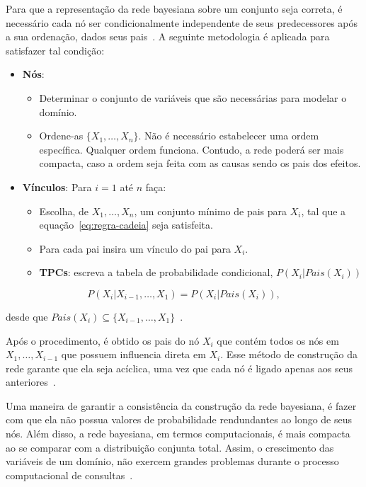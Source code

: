 Para que a representação da rede bayesiana sobre um conjunto seja correta, é necessário cada nó ser condicionalmente independente de seus predecessores após a sua ordenação, dados seus pais~\cite{Russell:2002}. A seguinte metodologia é aplicada para satisfazer tal condição:

\begin{itemize}
    \item \textbf{Nós}:
    \begin{itemize}
        \item Determinar o conjunto de variáveis que são necessárias para modelar o domínio.
        \item Ordene-as $\{ X_1, \dots, X_n\}$. Não é necessário estabelecer uma ordem específica. Qualquer ordem funciona. Contudo, a rede poderá ser mais compacta, caso a ordem seja feita com as causas sendo os pais dos efeitos.
    \end{itemize}
    \item \textbf{Vínculos}: Para $i = 1$ até $n$ faça:
    \begin{itemize}
        \item Escolha, de $X_1, \dots, X_n$, um conjunto mínimo de pais para $X_i$, tal que a equação~\ref{eq:regra-cadeia} seja satisfeita.
        \item Para cada pai insira um vínculo do pai para $X_i$.
        \item \textbf{TPCs}: escreva a tabela de probabilidade condicional, $P(X_i|Pais(X_i))$
    \end{itemize}
\end{itemize}

\begin{equation}
    \label{eq:regra-cadeia}
    P(X_i|X_{i-1},\dots,X_1) = P(X_i|Pais(X_i)),
\end{equation}

desde que $Pais(X_i) \subseteq \{X_{i-1},\dots,X_1\}$~\cite{Russell:2002}.

Após o procedimento, é obtido os pais do nó $X_i$ que contém todos os nós em $X_1, \dots, X_{i-1}$ que possuem influencia direta em $X_i$. Esse método de construção da rede garante que ela seja acíclica, uma vez que cada nó é ligado apenas aos seus anteriores~\cite{Russell:2002}.

Uma maneira de garantir a consistência da construção da rede bayesiana, é fazer com que ela não possua valores de probabilidade rendundantes ao longo de seus nós. Além disso, a rede bayesiana, em termos computacionais, é mais compacta ao se comparar com a distribuição conjunta total. Assim, o crescimento das variáveis de um domínio, não exercem grandes problemas durante o processo computacional de consultas~\cite{Russell:2002}.

